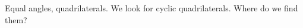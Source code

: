 





Equal angles, quadrilaterals. We look for cyclic quadrilaterals. Where do we find them?


















